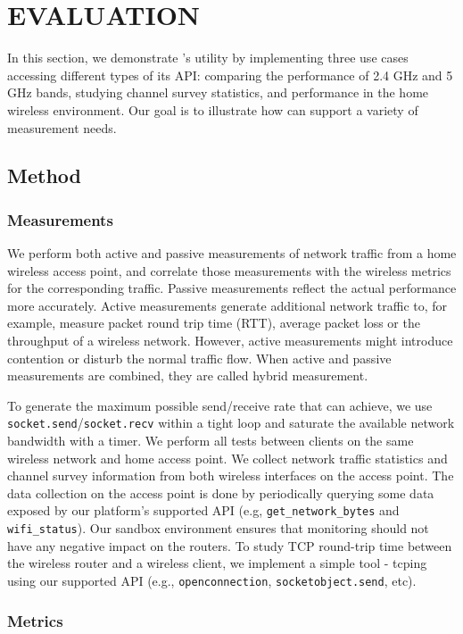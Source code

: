 \chapter{EVALUATION} 
\label{sec.evaluation}
In this section, we demonstrate \sysname's utility by implementing three use cases accessing different types of its API: comparing the performance of 2.4 GHz and 5 GHz bands, studying channel survey statistics, and performance in the home wireless environment. Our goal is to illustrate how \sysname can support a variety of measurement needs.
\section{Method}
\subsection{Measurements}
\label{ssec.measurements}

We perform both active and passive measurements of network traffic from a home wireless access point, and correlate those measurements with the wireless metrics for the corresponding traffic. Passive measurements reflect the actual performance more accurately. Active measurements generate additional network traffic to, for example, measure packet round trip time (RTT), average packet loss or the throughput of a wireless network. However, active measurements might introduce contention or disturb the normal traffic flow. When active and passive measurements are combined, they are called hybrid measurement. 

To generate the maximum possible send/receive rate that \sysname can achieve, we use \texttt{socket.send}/\texttt{socket.recv} within a tight loop and saturate the available network bandwidth with a timer. We perform all tests between clients on the same wireless network and home access point. We collect network traffic statistics and channel survey information from both wireless interfaces on the access point. The data collection on the access point is done by periodically querying some data exposed by our platform's supported API (e.g, \texttt{get\_network\_bytes} and \texttt{wifi\_status}). Our sandbox environment ensures that monitoring should not have any negative impact on the routers. To study TCP round-trip time between the wireless router and a wireless client, we implement a simple tool - tcping using our supported API (e.g., \texttt{openconnection}, \texttt{socketobject.send}, etc). 
 

\subsection{Metrics}
\label{ssec.metrics}

